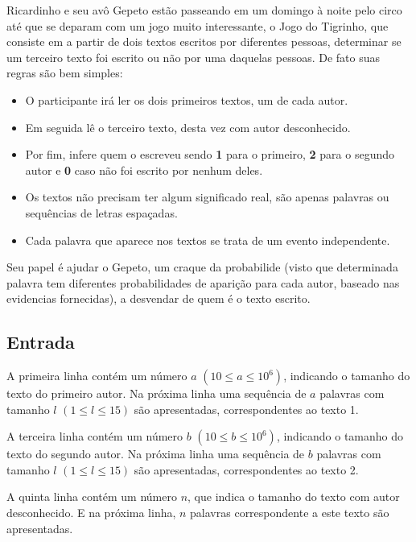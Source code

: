 Ricardinho e seu avô Gepeto estão passeando em um domingo à noite pelo circo até que se deparam com um jogo muito interessante, 
o Jogo do Tigrinho, que consiste em a partir de dois textos escritos por diferentes pessoas, determinar se um terceiro texto foi escrito ou não por uma daquelas pessoas.
De fato suas regras são bem simples:
\begin{itemize}
    \item O participante irá ler os dois primeiros textos, um de cada autor.
    \item Em seguida lê o terceiro texto, desta vez com autor desconhecido.
    \item Por fim, infere quem o escreveu sendo \textbf{1} para o primeiro, \textbf{2} para o segundo autor e \textbf{0} caso não foi escrito por nenhum deles.
    \item Os textos não precisam ter algum significado real, são apenas palavras ou sequências de letras espaçadas.
    \item Cada palavra que aparece nos textos se trata de um evento independente.
\end{itemize}

Seu papel é ajudar o Gepeto, um craque da probabilide (visto que determinada palavra tem diferentes probabilidades de 
aparição para cada autor, baseado nas evidencias fornecidas), a desvendar de quem é o texto escrito.

\subsection*{Entrada}

A primeira linha contém um número $a$ $(10 \leq a \leq 10^6)$, indicando o tamanho do texto do primeiro autor. 
Na próxima linha uma sequência de $a$ palavras com tamanho $l$ $(1 \leq l \leq 15)$ são apresentadas, correspondentes ao texto 1.

A terceira linha contém um número $b$ $(10 \leq b \leq 10^6)$, indicando o tamanho do texto do segundo autor.
Na próxima linha uma sequência de $b$ palavras com tamanho $l$ $(1 \leq l \leq 15)$ são apresentadas, correspondentes ao texto 2.

A quinta linha contém um número $n$, que indica o tamanho do texto com autor desconhecido.
E na próxima linha, $n$ palavras correspondente a este texto são apresentadas.


